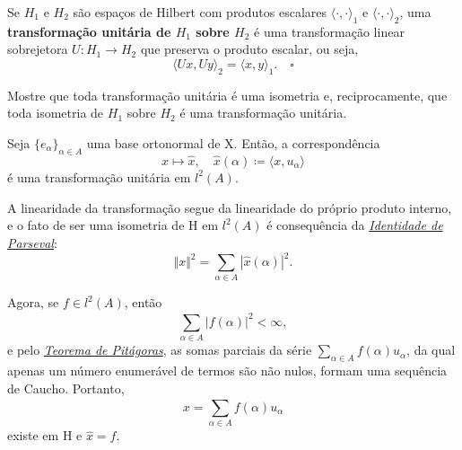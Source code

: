 \documentclass[../functional_analysis.tex]{subfiles}
\begin{document}
\begin{def*}
	Se \(H_1\) e \(H_2\) são espaços de Hilbert com produtos escalares \(\langle \cdot , \cdot  \rangle_1\) e \(\langle \cdot , \cdot  \rangle_2\), uma \textbf{transformação unitária de \(H_1\) sobre \(H_2\)} é uma transformação linear sobrejetora \(U:H_1\rightarrow H_2\) que preserva o produto escalar, ou seja,
	\[
		\langle Ux, Uy \rangle_2 = \langle x, y \rangle_1. \quad \square
	\]
\end{def*}
\begin{exr}
	Mostre que toda transformação unitária é uma isometria e, reciprocamente, que toda isometria de \(H_1\) sobre \(H_2\) é uma transformação unitária.
\end{exr}
\begin{prop*}
	Seja \(\{e_{\alpha }\}_{\alpha \in A}\) uma base ortonormal de X. Então, a correspondência
	\[
		x\mapsto \hat{x},\quad \hat{x}(\alpha )\coloneqq \langle x, u_{\alpha } \rangle
	\]
	é uma transformação unitária em \(l^{2}(A).\)
\end{prop*}
\begin{proof*}
	A linearidade da transformação segue da linearidade do próprio produto interno, e o fato de ser uma isometria de H em \(l^{2}(A)\) é consequência da \hyperlink{parseval_identity}{\textit{Identidade de Parseval}}:
	\[
		\Vert x \Vert^{2} = \sum\limits_{\alpha \in A}^{}| \hat{x}(\alpha ) |^{2}.
	\]

	Agora, se \(f\in l^{2}(A)\), então
	\[
		\sum\limits_{\alpha \in A}^{} | f(\alpha ) |^{2}<\infty,
	\]
	e pelo \hyperlink{pythagorean_theorem}{\textit{Teorema de Pitágoras}}, as somas parciais da série \(\sum\limits_{\alpha \in A}^{}f(\alpha )u_{\alpha }\), da qual apenas um número enumerável de termos são não nulos, formam uma sequência de Caucho. Portanto,
	\[
		x = \sum\limits_{\alpha \in A}^{}f(\alpha )u_{\alpha }
	\]
	existe em H e \(\hat{x}=f.\) \qedsymbol
\end{proof*}
\end{document}
